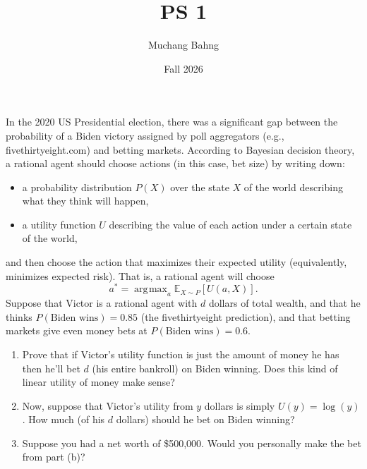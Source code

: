 \documentclass{article}
\DeclareMathOperator*{\argmax}{\arg\!\max}
\newcounter{exercise}
\begin{document}
\title{PS 1}
\author{Muchang Bahng}
\date{Fall 2026}

\maketitle

\begin{exercise}
  In the 2020 US Presidential election, there was a significant gap between the probability of a Biden victory assigned by poll aggregators (e.g., fivethirtyeight.com) and betting markets. According to Bayesian decision theory, a rational agent should choose actions (in this case, bet size) by writing down:
  \begin{itemize}
    \item a probability distribution $P(X)$ over the state $X$ of the world describing what they think will happen,
    \item a utility function $U$ describing the value of each action under a certain state of the world,
  \end{itemize}
  and then choose the action that maximizes their expected utility (equivalently, minimizes expected risk). That is, a rational agent will choose
  \[
    a^* = \argmax_a \mathbb{E}_{X \sim P}\left[U(a, X)\right].
  \]
  Suppose that Victor is a rational agent with $d$ dollars of total wealth, and that he thinks $P(\text{Biden wins}) = 0.85$ (the fivethirtyeight prediction), and that betting markets give even money bets at $P(\text{Biden wins}) = 0.6$.
  \begin{enumerate}[label=(\alph*)]
    \item Prove that if Victor's utility function is just the amount of money he has then he'll bet $d$ (his entire bankroll) on Biden winning. Does this kind of linear utility of money make sense?
    \item Now, suppose that Victor's utility from $y$ dollars is simply $U(y) = \log(y)$. How much (of his $d$ dollars) should he bet on Biden winning?
    \item Suppose you had a net worth of \$500,000. Would you personally make the bet from part (b)?
  \end{enumerate}
\end{exercise}
\end{document}
